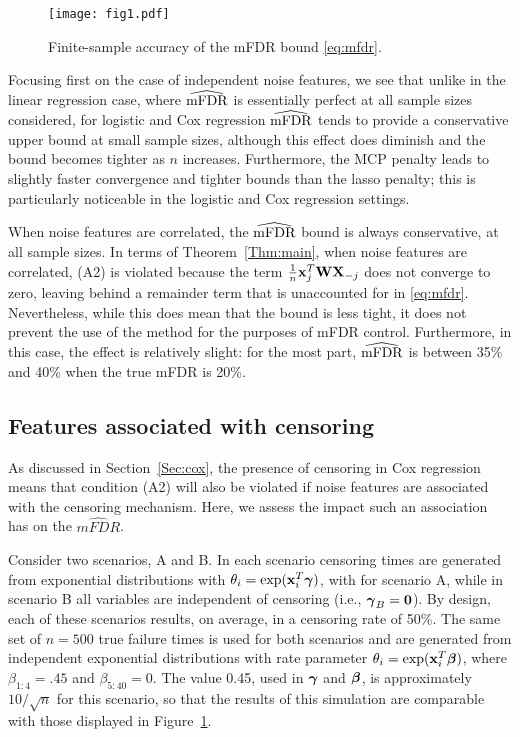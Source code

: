 \begin{figure} [!htb]
 \centering
  \texttt{[image: fig1.pdf]}
  \caption{\label{Fig:converge}Finite-sample accuracy of the mFDR bound \eqref{eq:mfdr}.}
\end{figure}

Focusing first on the case of independent noise features, we see that unlike in the linear regression case, where $\widehat{\textrm{mFDR}}$ is essentially perfect at all sample sizes considered, for logistic and Cox regression $\widehat{\textrm{mFDR}}$ tends to provide a conservative upper bound at small sample sizes, although this effect does diminish and the bound becomes tighter as $n$ increases.
Furthermore, the MCP penalty leads to slightly faster convergence and tighter bounds than the lasso penalty; this is particularly noticeable in the logistic and Cox regression settings.

When noise features are correlated, the $\widehat{\textrm{mFDR}}$ bound is always conservative, at all sample sizes.  In terms of Theorem~\ref{Thm:main}, when noise features are correlated, (A2) is violated because the term $\frac{1}{n}\mathbf{x}_j^T\mathbf{W}\mathbf{X}_{-j}$ does not converge to zero, leaving behind a remainder term that is unaccounted for in \eqref{eq:mfdr}.
Nevertheless, while this does mean that the bound is less tight, it does not prevent the use of the method for the purposes of mFDR control.
Furthermore, in this case, the effect is relatively slight: for the most part, $\widehat{\textrm{mFDR}}$ is between 35\% and 40\% when the true mFDR is 20\%.

\subsection{Features associated with censoring}

As discussed in Section~\ref{Sec:cox}, the presence of censoring in Cox regression means that condition (A2) will also be violated if noise features are associated with the censoring mechanism.  Here, we assess the impact such an association has on the $\widehat{mFDR}$.

Consider two scenarios, A and B. In each scenario censoring times are generated from exponential distributions with $\theta_{i} = \exp(\mathbf{x}_i^T \boldsymbol{\gamma})$, with
for scenario A, while in scenario B all variables are independent of censoring (i.e., $\boldsymbol{\gamma}_B = \mathbf{0}$).  By design, each of these scenarios results, on average, in a censoring rate of 50\%.  The same set of $n = 500$ true failure times is used for both scenarios and are generated from independent exponential distributions with rate parameter $\theta_i = \exp(\mathbf{x}_i^T \boldsymbol{\beta})$, where $\beta_{1:4} = .45$ and $\beta_{5:40} = 0$.  The value 0.45, used in $\boldsymbol{\gamma}$ and $\boldsymbol{\beta}$, is approximately $10/\sqrt{n}$ for this scenario, so that the results of this simulation are comparable with those displayed in Figure~\ref{Fig:converge}.

